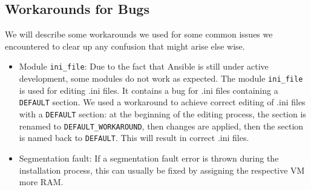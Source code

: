 \begin{appendix}
\subsection{Workarounds for Bugs}
We will describe some workarounds we used for some common issues we encountered to clear up any confusion that might arise else wise.
\begin{itemize}
	\item Module \verb|ini_file|: Due to the fact that Ansible is still under active development, some modules do not work as expected. The module \verb|ini_file| is used for editing .ini files. It contains a bug for .ini files containing a \verb|DEFAULT| section. We used a workaround to achieve correct editing of .ini files with a \verb|DEFAULT| section: at the beginning of the editing process, the section is renamed to \verb|DEFAULT_WORKAROUND|, then changes are applied, then the section is named back to \verb|DEFAULT|. This will result in correct .ini files.
	
	\item Segmentation fault: If a segmentation fault error is thrown during the installation process, this can usually be fixed by assigning the respective VM more RAM.
\end{itemize}








\end{appendix}